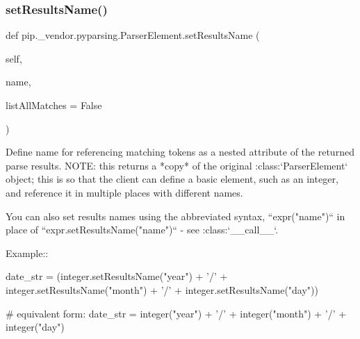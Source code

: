  \mbox{\label{classpip_1_1__vendor_1_1pyparsing_1_1ParserElement_ab7887526af9674a6b7969bd4d9756bf9}} 
\subsubsection{\texorpdfstring{set\+Results\+Name()}{setResultsName()}}
{\footnotesize\ttfamily def pip.\+\_\+vendor.\+pyparsing.\+Parser\+Element.\+set\+Results\+Name (\begin{DoxyParamCaption}\item[{}]{self,  }\item[{}]{name,  }\item[{}]{list\+All\+Matches = {\ttfamily False} }\end{DoxyParamCaption})}

\begin{DoxyVerb}Define name for referencing matching tokens as a nested attribute
of the returned parse results.
NOTE: this returns a *copy* of the original :class:`ParserElement` object;
this is so that the client can define a basic element, such as an
integer, and reference it in multiple places with different names.

You can also set results names using the abbreviated syntax,
``expr("name")`` in place of ``expr.setResultsName("name")``
- see :class:`__call__`.

Example::

    date_str = (integer.setResultsName("year") + '/'
        + integer.setResultsName("month") + '/'
        + integer.setResultsName("day"))

    # equivalent form:
    date_str = integer("year") + '/' + integer("month") + '/' + integer("day")
\end{DoxyVerb}
 \mbox{\label{classpip_1_1__vendor_1_1pyparsing_1_1ParserElement_a1bc77f728d2c1e6e46851407fed3ebe1}} 
